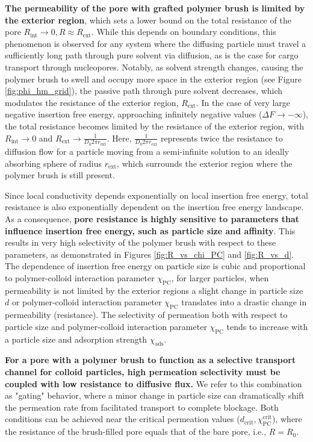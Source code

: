 \documentclass[12pt, a4paper]{article}
\begin{document}
\textbf{The permeability of the pore with grafted polymer brush is limited by the exterior region}, which sets a lower bound on the total resistance of the pore $R_{\text{int}} \to 0 , R \approx R_{\text{ext}}$.
While this depends on boundary conditions, this phenomenon is observed for any system where the diffusing particle must travel a sufficiently long path through pure solvent via diffusion, as is the case for cargo transport through nucleopores.%
Notably, as solvent strength changes, causing the polymer brush to swell and occupy more space in the exterior region (see Figure \ref{fig:phi_hm_grid}), the passive path through pure solvent decreases, which modulates the resistance of the exterior region, $R_{\text{ext}}$.
In the case of very large negative insertion free energy, approaching infinitely negative values ($\Delta F \to -\infty$), the total resistance becomes limited by the resistance of the exterior region, with $R_{\text{int}} \to 0$ and $R_{\text{ext}} \to \frac{1}{D_0 2 \pi r_{\text{ext}}}$.
Here, $\frac{1}{D_0 2 \pi r_{\text{ext}}}$ represents twice the resistance to diffusion flow for a particle moving from a semi-infinite solution to an ideally absorbing sphere of radius $r_{\text{ext}}$, which surrounds the exterior region where the polymer brush is still present.

Since local conductivity depends exponentially on local insertion free energy, total resistance is also exponentially dependent on the insertion free energy landscape.
As a consequence, \textbf{pore resistance is highly sensitive to parameters that influence insertion free energy, such as particle size and affinity}.
This results in very high selectivity of the polymer brush with respect to these parameters, as demonstrated in Figures \ref{fig:R_vs_chi_PC} and \ref{fig:R_vs_d}.
The dependence of insertion free energy on particle size is cubic and proportional to polymer-colloid interaction parameter $\chi_{\text{PC}}$, for larger particles, when permeability is not limited by the exterior regions a slight change in particle size $d$ or polymer-colloid interaction parameter $\chi_{\text{PC}}$ translates into a drastic change in permeability (resistance).
The selectivity of permeation both with respect to particle size and polymer-colloid interaction parameter $\chi_{\text{PC}}$ tends to increase with a particle size and adsorption strength $\chi_{\text{ads}}$.

\textbf{For a pore with a polymer brush to function as a selective transport channel for colloid particles, high permeation selectivity must be coupled with low resistance to diffusive flux.}
We refer to this combination as "gating" behavior, where a minor change in particle size can dramatically shift the permeation rate from facilitated transport to complete blockage.
Both conditions can be achieved near the critical permeation values ($d_{\text{crit}}, \chi_{\text{PC}}^{\text{crit}}$), where the resistance of the brush-filled pore equals that of the bare pore, i.e., $R = R_{0}$.
\end{document}
